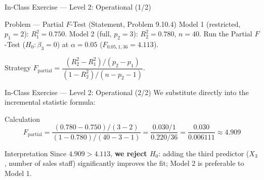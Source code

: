 \documentclass[10pt, aspectratio=169]{beamer}
\begin{document}
\begin{frame}{In-Class Exercise --- Level 2: Operational (1/2)}
  \footnotesize
  \begin{block}{Problem --- Partial $F$-Test (Statement, Problem 9.10.4)}
    Model 1 (restricted, $p_1=2$): $R_1^2=0.750$. Model 2 (full, $p_2=3$): $R_2^2=0.780$, $n=40$. Run the Partial $F$-Test ($H_0:\beta_3=0$) at $\alpha=0.05$ ($F_{0.05,1,36}=4.113$).
  \end{block}

  \vspace{0.15cm}
  \pause
  \begin{alertblock}{Strategy}
    \scriptsize
    $F_{\text{partial}}=\dfrac{(R_2^2-R_1^2)/(p_2-p_1)}{(1-R_2^2)/(n-p_2-1)}$.
  \end{alertblock}
\end{frame}

\begin{frame}{In-Class Exercise --- Level 2: Operational (2/2)}
  \scriptsize
  We substitute directly into the incremental statistic formula: \pause

  \vspace{0.05cm}
  \begin{block}{Calculation}
    $$F_{\text{partial}}=\frac{(0.780-0.750)/(3-2)}{(1-0.780)/(40-3-1)}=\frac{0.030/1}{0.220/36}=\frac{0.030}{0.006111}\approx4.909$$
  \end{block}

  \vspace{0.05cm}
  \pause
  \begin{alertblock}{Interpretation}
    Since $4.909>4.113$, \textbf{we reject $H_0$}: adding the third predictor ($X_3$, number of sales staff) significantly improves the fit; Model 2 is preferable to Model 1.
  \end{alertblock}
\end{frame}
\end{document}
